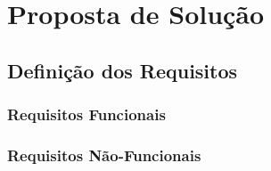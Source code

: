 \chapter{Proposta de Solução}
\label{cp:proposta}

\section{Definição dos Requisitos}
\subsection{Requisitos Funcionais}

\subsection{Requisitos Não-Funcionais}